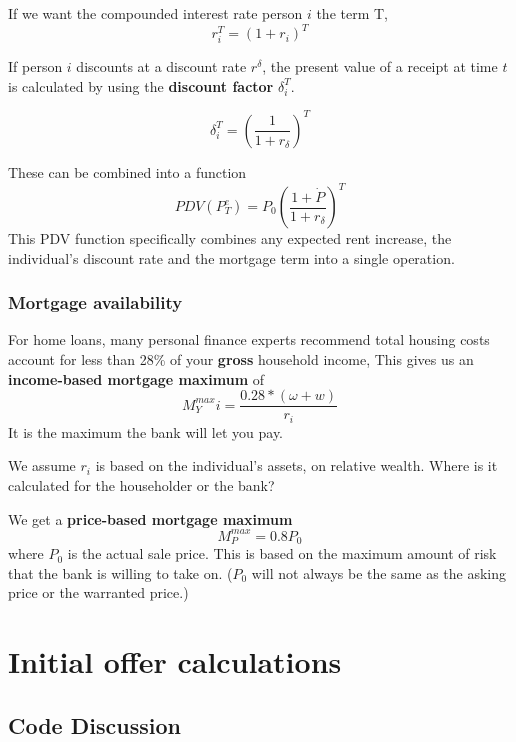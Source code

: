 If we want the compounded interest rate person $i$ the term T,
\[r_i^T=(1+r_i)^T\]

If person $i$  discounts at a discount rate $r^\delta$, the present value of a receipt at time $t$ is calculated by using the \textbf{discount factor} $\delta_i^T$.

\[\delta_i^T= \left( \frac{1}{1+r_\delta} \right)^T \]
 
These can be combined into a function %
\[ PDV(P^e_T)=P_0\left( \frac{1+\dot P}{1+r_\delta} \right)^T \]
This PDV function specifically combines any expected rent increase, the individual's discount rate and the mortgage term into a single operation.

\subsection{Mortgage availability}
For home loans, many personal finance experts recommend total housing costs account for less than 28\% of your \textbf{gross} household income, This gives us an \textbf{income-based  mortgage maximum} of \[M^{max}_Yi = \frac{0.28*(\omega+w)}{r_i}\] It is the maximum the bank will let you pay.

We assume $r_i$ is based on the individual's assets, on relative wealth. Where is it calculated for the householder or the bank?

We get a \textbf{price-based mortgage maximum} \[M^{max}_P = 0.8P_0\] where $P_0$ is the actual sale price. This is based on the maximum amount of risk that the bank is willing to take on. ($P_0$  will not always be the same as the asking price or the warranted price.)


\chapter{Initial offer calculations}
\section{Code Discussion}

